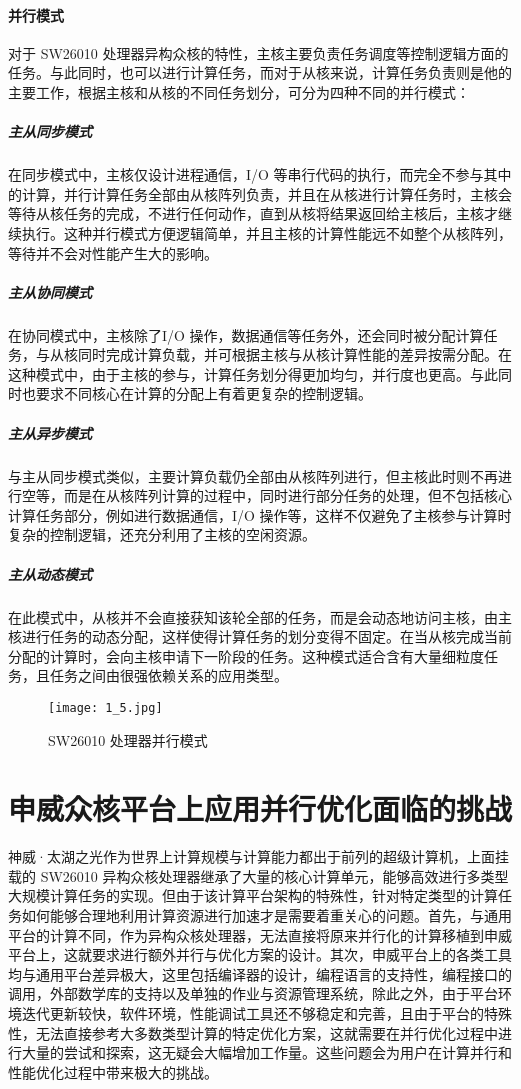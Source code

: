 \paragraph{并行模式}
对于 SW26010 处理器异构众核的特性，主核主要负责任务调度等控制逻辑方面的任务。与此同时，也可以进行计算任务，而对于从核来说，计算任务负责则是他的主要工作，根据主核和从核的不同任务划分，可分为四种不同的并行模式：
\subparagraph{主从同步模式}
在同步模式中，主核仅设计进程通信，I/O 等串行代码的执行，而完全不参与其中的计算，并行计算任务全部由从核阵列负责，并且在从核进行计算任务时，主核会等待从核任务的完成，不进行任何动作，直到从核将结果返回给主核后，主核才继续执行。这种并行模式方便逻辑简单，并且主核的计算性能远不如整个从核阵列，等待并不会对性能产生大的影响。

\subparagraph{主从协同模式}
在协同模式中，主核除了I/O 操作，数据通信等任务外，还会同时被分配计算任务，与从核同时完成计算负载，并可根据主核与从核计算性能的差异按需分配。在这种模式中，由于主核的参与，计算任务划分得更加均匀，并行度也更高。与此同时也要求不同核心在计算的分配上有着更复杂的控制逻辑。

\subparagraph{主从异步模式}
与主从同步模式类似，主要计算负载仍全部由从核阵列进行，但主核此时则不再进行空等，而是在从核阵列计算的过程中，同时进行部分任务的处理，但不包括核心计算任务部分，例如进行数据通信，I/O 操作等，这样不仅避免了主核参与计算时复杂的控制逻辑，还充分利用了主核的空闲资源。

\subparagraph{主从动态模式}
在此模式中，从核并不会直接获知该轮全部的任务，而是会动态地访问主核，由主核进行任务的动态分配，这样使得计算任务的划分变得不固定。在当从核完成当前分配的计算时，会向主核申请下一阶段的任务。这种模式适合含有大量细粒度任务，且任务之间由很强依赖关系的应用类型。

 \begin{figure}[h]
  \centering
  \texttt{[image: 1\_5.jpg]}
  \caption{SW26010 处理器并行模式}
  \label{fig:badge}
\end{figure}

\section{申威众核平台上应用并行优化面临的挑战}
神威·太湖之光作为世界上计算规模与计算能力都出于前列的超级计算机，上面挂载的 SW26010 异构众核处理器继承了大量的核心计算单元，能够高效进行多类型大规模计算任务的实现。但由于该计算平台架构的特殊性，针对特定类型的计算任务如何能够合理地利用计算资源进行加速才是需要着重关心的问题。首先，与通用平台的计算不同，作为异构众核处理器，无法直接将原来并行化的计算移植到申威平台上，这就要求进行额外并行与优化方案的设计。其次，申威平台上的各类工具均与通用平台差异极大，这里包括编译器的设计，编程语言的支持性，编程接口的调用，外部数学库的支持以及单独的作业与资源管理系统，除此之外，由于平台环境迭代更新较快，软件环境，性能调试工具还不够稳定和完善，且由于平台的特殊性，无法直接参考大多数类型计算的特定优化方案，这就需要在并行优化过程中进行大量的尝试和探索，这无疑会大幅增加工作量。这些问题会为用户在计算并行和性能优化过程中带来极大的挑战。


